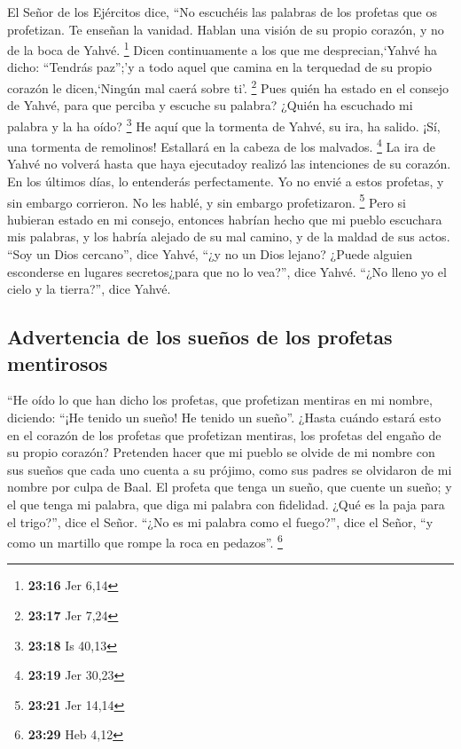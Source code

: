  El Señor de los Ejércitos dice, ``No escuchéis las
palabras de los profetas que os profetizan. Te enseñan la vanidad.
Hablan una visión de su propio corazón, y no de la boca de Yahvé.
\footnote{\textbf{23:16} Jer 6,14}  Dicen continuamente a
los que me desprecian,`Yahvé ha dicho: ``Tendrás paz'';'y a todo aquel
que camina en la terquedad de su propio corazón le dicen,`Ningún mal
caerá sobre ti'. \footnote{\textbf{23:17} Jer 7,24}  Pues
quién ha estado en el consejo de Yahvé, para que perciba y escuche su
palabra? ¿Quién ha escuchado mi palabra y la ha oído? \footnote{\textbf{23:18}
  Is 40,13}  He aquí que la tormenta de Yahvé, su ira, ha
salido. ¡Sí, una tormenta de remolinos! Estallará en la cabeza de los
malvados. \footnote{\textbf{23:19} Jer 30,23}  La ira de
Yahvé no volverá hasta que haya ejecutadoy realizó las intenciones de su
corazón. En los últimos días, lo entenderás perfectamente.
 Yo no envié a estos profetas, y sin embargo corrieron.
No les hablé, y sin embargo profetizaron. \footnote{\textbf{23:21} Jer
  14,14}  Pero si hubieran estado en mi consejo, entonces
habrían hecho que mi pueblo escuchara mis palabras, y los habría alejado
de su mal camino, y de la maldad de sus actos.  ``Soy un
Dios cercano'', dice Yahvé, ``¿y no un Dios lejano? 
¿Puede alguien esconderse en lugares secretos¿para que no lo vea?'',
dice Yahvé. ``¿No lleno yo el cielo y la tierra?'', dice Yahvé.

\hypertarget{advertencia-de-los-sueuxf1os-de-los-profetas-mentirosos}{%
\subsection{Advertencia de los sueños de los profetas
mentirosos}\label{advertencia-de-los-sueuxf1os-de-los-profetas-mentirosos}}

 ``He oído lo que han dicho los profetas, que profetizan
mentiras en mi nombre, diciendo: ``¡He tenido un sueño! He tenido un
sueño''.  ¿Hasta cuándo estará esto en el corazón de los
profetas que profetizan mentiras, los profetas del engaño de su propio
corazón?  Pretenden hacer que mi pueblo se olvide de mi
nombre con sus sueños que cada uno cuenta a su prójimo, como sus padres
se olvidaron de mi nombre por culpa de Baal.  El profeta
que tenga un sueño, que cuente un sueño; y el que tenga mi palabra, que
diga mi palabra con fidelidad. ¿Qué es la paja para el trigo?'', dice el
Señor.  ``¿No es mi palabra como el fuego?'', dice el
Señor, ``y como un martillo que rompe la roca en pedazos''. \footnote{\textbf{23:29}
  Heb 4,12}

